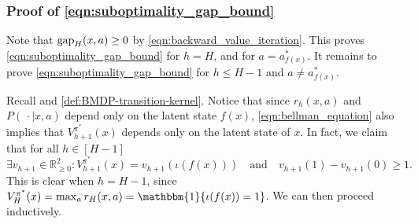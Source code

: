 \documentclass[11pt]{article}
\newcommand{\mbbR}{\mathbb{R}}
\newcommand{\gap}{\textnormal{gap}}
\theoremstyle{definition}
\theoremstyle{definition}
\begin{document}
\subsubsection{Proof of \texorpdfstring{\eqref{eqn:suboptimality_gap_bound}}{suboptimality gap bound}}

Note that $\gap_H(x,a) \geq 0$ by \eqref{eqn:backward_value_iteration}.
This proves \eqref{eqn:suboptimality_gap_bound} for $h = H$, and for $a = a_{f(x)}^*$.
It remains to prove \eqref{eqn:suboptimality_gap_bound} for $h\leq H-1$ and $a\neq a_{f(x)}^*$.

Recall  and \eqref{def:BMDP-transition-kernel}.
Notice that since $r_h(x,a)$ and $P(\,\cdot\mid x,a)$ depend only on the latent state $f(x)$, \eqref{eqn:bellman_equation} also implies that $V^{\pi^*}_{h+1}(x)$ depends only on the latent state of $x$.
In fact, we claim that for all $h\in[H-1]$
\begin{equation}
	\label{eqn:induction_claim}
	\exists v_{h+1}\in\mbbR_{\geq0}^2:
	V^{\pi^*}_{h+1}(x)
	=
	v_{h+1}(\iota(f(x)))
	\quad \mathrm{and}\quad
	v_{h+1}(1)-v_{h+1}(0)\geq 1.
\end{equation}
This is clear when $h=H-1$, since $V^{\pi^*}_{H}(x)=\max_{a}r_H(x,a)=\mathbbm{1}\{\iota(f(x)) = 1\}$.
We can then proceed inductively.
\end{document}
